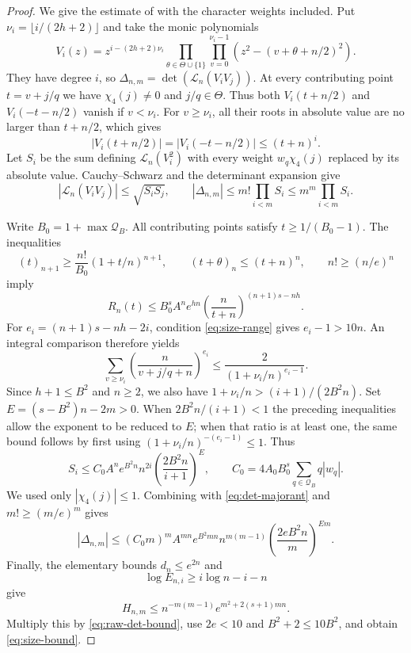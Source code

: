 \documentclass[11pt]{article}
\theoremstyle{remark}
\newcommand{\Lcal}{\mathcal L}
\numberwithin{equation}{section}
\begin{document}
\begin{proof}
We give the estimate of \cite[Proposition~4.1]{FLSZ} with the character
weights included. Put $\nu_i=\lfloor i/(2h+2)\rfloor$ and take the monic
polynomials
\[
 V_i(z)=z^{i-(2h+2)\nu_i}
       \prod_{\theta\in\Theta\cup\{1\}}\prod_{v=0}^{\nu_i-1}
        \left(z^2-(v+\theta+n/2)^2\right).
\]
They have degree $i$, so $\Delta_{n,m}=\det(\Lcal_n(V_iV_j))$.
At every contributing point $t=v+j/q$ we have $\chi_4(j)\ne0$ and
$j/q\in\Theta$. Thus both $V_i(t+n/2)$ and $V_i(-t-n/2)$ vanish if
$v<\nu_i$. For $v\geq\nu_i$, all their roots in absolute value
are no larger than $t+n/2$, which gives
\[
 |V_i(t+n/2)|=|V_i(-t-n/2)|\leq(t+n)^i.
\]
Let $S_i$ be the sum defining $\Lcal_n(V_i^2)$ with every weight
$w_q\chi_4(j)$ replaced by its absolute value. Cauchy--Schwarz and the
determinant expansion give
\begin{equation}\label{eq:det-majorant}
 |\Lcal_n(V_iV_j)|\leq\sqrt{S_iS_j},\qquad
 |\Delta_{n,m}|\leq m!\prod_{i<m}S_i\leq m^m\prod_{i<m}S_i.
\end{equation}

Write $B_0=1+\max\mathcal Q_B$. All contributing points satisfy $t\geq1/(B_0-1)$.
The inequalities
\[
 (t)_{n+1}\geq\frac{n!}{B_0}(1+t/n)^{n+1},\qquad
 (t+\theta)_n\leq(t+n)^n,\qquad n!\geq(n/e)^n
\]
imply
\[
 R_n(t)\leq B_0^s A^n e^{hn}
             \left(\frac{n}{t+n}\right)^{(n+1)s-nh}.
\]
For $e_i=(n+1)s-nh-2i$, condition \eqref{eq:size-range} gives
$e_i-1>10n$. An integral comparison therefore yields
\[
 \sum_{v\geq\nu_i}\left(\frac{n}{v+j/q+n}\right)^{e_i}
 \leq\frac{2}{(1+\nu_i/n)^{e_i-1}}.
\]
Since $h+1\leq B^2$ and $n\geq2$, we also have
$1+\nu_i/n>(i+1)/(2B^2n)$. Set $E=(s-B^2)n-2m>0$.
When $2B^2n/(i+1)<1$ the preceding inequalities allow the exponent to
be reduced to $E$; when that ratio is at least one, the same bound follows
by first using $(1+\nu_i/n)^{-(e_i-1)}\leq1$. Thus
\[
 S_i\leq C_0 A^n e^{B^2n}n^{2i}
                 \left(\frac{2B^2n}{i+1}\right)^E,
 \qquad C_0=4A_0B_0^s\sum_{q\in\mathcal Q_B}q|w_q|.
\]
We used only $|\chi_4(j)|\leq1$. Combining with
\eqref{eq:det-majorant} and $m!\geq(m/e)^m$ gives
\begin{equation}\label{eq:raw-det-bound}
 |\Delta_{n,m}|\leq(C_0m)^m A^{mn}e^{B^2mn}n^{m(m-1)}
                \left(\frac{2eB^2n}{m}\right)^{Em}.
\end{equation}
Finally, the elementary bounds $d_n\leq e^{2n}$ and
\[
 \log E_{n,i}\geq i\log n-i-n
\]
give
\[
 H_{n,m}\leq n^{-m(m-1)}e^{m^2+2(s+1)mn}.
\]
Multiply this by \eqref{eq:raw-det-bound}, use $2e<10$ and
$B^2+2\leq10B^2$, and obtain \eqref{eq:size-bound}.
\end{proof}
\end{document}
